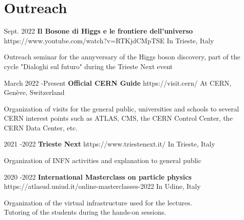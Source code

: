 \documentclass[10pt]{article} %
\begin{document}
\section{Outreach}

\job
{Sept.  2022}{}
{\textbf{Il Bosone di Higgs e le frontiere dell'universo}}
{https://www.youtube.com/watch?v=RTKjdCMpTSE}
{In Trieste, Italy}
{\begin{minipage}[c][][b]{0,7\textwidth}
Outreach seminar for the  annyversary of the Higgs boson discovery, part of the cycle "Dialoghi sul futuro" during the Trieste Next event
\end{minipage}
}


\job
{March 2022 -}{Present}
{\textbf{Official CERN Guide}}
{https://visit.cern/}
{At CERN, Genève, Switzerland}
{\begin{minipage}[c][][b]{0,7\textwidth}
 Organization of visits for the general public, universities and schools to several CERN interest points such as ATLAS, CMS, the CERN Control Center, the CERN Data Center, etc.
\end{minipage}
}

\job
{2021 -}{2022}
{\textbf{Trieste Next}}
{https://www.triestenext.it/}
{In Trieste, Italy}
{\begin{minipage}[c][][b]{0,7\textwidth}
 Organization of INFN activities and explanation to general public
\end{minipage}
}

\job
{2020 -}{2022}
{\textbf{International Masterclass on particle physics}}
{https://atlasud.uniud.it/online-masterclasses-2022}
{In Udine, Italy}
{\begin{minipage}[c][][b]{0,7\textwidth}
 Organization of the virtual infrastructure used for the lectures. \\
 Tutoring of the students during the hands-on sessions.
\end{minipage}
}
\end{document}

